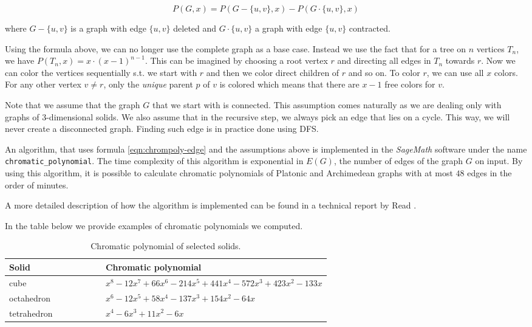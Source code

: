 \begin{equation}\label{eqn:chrompoly-edge}
    P(G,x) = P(G - \{u,v\},x) - P(G \cdot \{u,v\},x)
\end{equation}

where $G - \{u,v\}$ is a graph with edge $\{u,v\}$ deleted and $G \cdot \{u,v\}$ a graph with edge $\{u,v\}$ contracted. 

Using the formula above, we can no longer use the complete graph as a base case. Instead we use the fact that for a tree on $n$ vertices $T_n$, we have $P(T_n,x) = x \cdot (x-1)^{n-1}$. This can be imagined by choosing a root vertex $r$ and directing all edges in $T_n$ towards $r$. Now we can color the vertices sequentially s.t. we start with $r$ and then we color direct children of $r$ and so on. To color $r$, we can use all $x$ colors. For any other vertex $v \neq r$, only the \textit{unique} parent $p$ of $v$ is colored which means that there are $x-1$ free colors for $v$. 

Note that we assume that the graph $G$ that we start with is connected. This assumption comes naturally as we are dealing only with graphs of 3-dimensional solids. We also assume that in the recursive step, we always pick an edge that lies on a cycle. This way, we will never create a disconnected graph. Finding such edge is in practice done using DFS.


An algorithm, that uses formula \ref{eqn:chrompoly-edge} and the assumptions above is implemented in the \textit{SageMath} \cite{sagemath} software under the name \verb|chromatic_polynomial|. The time complexity of this algorithm is exponential in $E(G)$, the number of edges of the graph $G$ on input. By using this algorithm, it is possible to calculate chromatic polynomials of Platonic and Archimedean graphs with at most $48$ edges in the order of minutes.

A more detailed description of how the algorithm is implemented can be found in a technical report by Read \cite{read1987chromatic}.

In the table below we provide examples of chromatic polynomials we computed.

\begin{table}[H]
\centering
\begin{tabular}{lp{0.7\linewidth}}
\toprule
\textbf{Solid} & \textbf{Chromatic polynomial} \\
\midrule
cube & $x^{8} - 12x^{7} + 66x^{6} - 214x^{5} + 441x^{4} - 572x^{3} + 423x^{2} - 133x$ \\
octahedron & $x^{6} - 12x^{5} + 58x^{4} - 137x^{3} + 154x^{2} - 64x$ \\
tetrahedron & $x^{4} - 6x^{3} + 11x^{2} - 6x$ \\
\bottomrule
\end{tabular}
\caption{Chromatic polynomial of selected solids.}
\label{tab:selected-chrom-polys}
\end{table}

